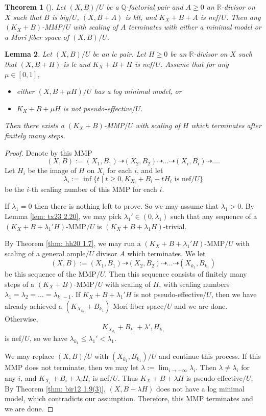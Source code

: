 \documentclass[11pt]{amsart}
\numberwithin{equation}{section}
\newcommand{\Qq}{\mathbb{Q}}
\newcommand{\Rr}{\mathbb{R}}
\newtheorem{thm}{Theorem}[section]
\newtheorem{lem}[thm]{Lemma}
\theoremstyle{definition}
\theoremstyle{definition}
\theoremstyle{definition}
\begin{document}
\begin{thm}[{\cite[Corollary 1.4.2]{BCHM10}}]\label{thm: bchm 1.4.2}
    Let $(X,B)/U$ be a $\Qq$-factorial pair and $A\geq 0$ an $\Rr$-divisor on $X$ such that $B$ is big$/U$, $(X,B+A)$ is klt, and $K_X+B+A$ is nef$/U$. Then any $(K_X+B)$-MMP$/U$ with scaling of $A$ terminates with either a minimal model or a Mori fiber space of $(X,B)/U$.
\end{thm}


\begin{lem}\label{lem: gmmp scaling numbers go to 0}
Let $(X,B)/U$ be an lc pair. Let $H\geq 0$ be an $\Rr$-divisor on $X$ such that $(X,B+H)$ is lc and $K_X+B+H$ is nef$/U$. Assume that for any $\mu\in [0,1]$,
\begin{itemize}
    \item either $(X,B+\mu H)/U$ has a log minimal model, or
    \item $K_X+B+\mu H$ is not pseudo-effective$/U$.
\end{itemize}
Then there exists a $(K_X+B)$-MMP$/U$ with scaling of $H$ which terminates after finitely many steps.
\end{lem}
\begin{proof}
Denote by this MMP
$$(X,B):=(X_1,B_1)\dashrightarrow (X_2,B_2)\dashrightarrow\dots\dashrightarrow (X_i,B_i)\dashrightarrow\dots.$$
Let $H_i$ be the image of $H$ on $X_i$ for each $i$, and let
$$\lambda_i:=\inf\{t\mid t\geq 0, K_{X_i}+B_i+tH_i\text{ is nef/}U\}$$
be the $i$-th scaling number of this MMP for each $i$.


If $\lambda_1=0$ then there is nothing left to prove. So we may assume that $\lambda_1>0$. By Lemma \ref{lem: tx23 2.20}, we may pick $\lambda_1'\in (0,\lambda_1)$ such that any sequence of a $(K_X+B+\lambda_1'H)$-MMP$/U$ is $(K_X+B+\lambda_1H)$-trivial. 

By Theorem \ref{thm: hh20 1.7}, we may run a $(K_X+B+\lambda_1'H)$-MMP$/U$ with scaling of a general ample$/U$ divisor $A$ which terminates. We let
$$(X,B):=(X_1,B_1)\dashrightarrow (X_2,B_2)\dashrightarrow\dots\dashrightarrow (X_{k_1},B_{k_1})$$
be this sequence of the MMP$/U$. Then this sequence consists of finitely many steps of a $(K_X+B)$-MMP$/U$ with scaling of $H$, with scaling numbers $\lambda_1=\lambda_2=\dots=\lambda_{k_1-1}$. If  $K_X+B+\lambda_1'H$ is not pseudo-effective$/U$, then we have already achieved a $(K_{X_{k_1}}+B_{k_1})$-Mori fiber space$/U$ and we are done. Otherwise,
$$K_{X_{k_1}}+B_{k_1}+\lambda'_1H_{k_1}$$
is nef$/U$, so we have $\lambda_{k_1}\leq\lambda_1'<\lambda_1$. 

We may replace $(X,B)/U$ with $(X_{k_1},B_{k_1})/U$ and continue this process. If this MMP does not terminate, then we may let $\lambda:=\lim_{i\rightarrow+\infty}\lambda_i$. Then $\lambda\not=\lambda_i$ for any $i$, and $K_{X_i}+B_i+\lambda_iH_i$ is nef$/U$. Thus $K_X+B+\lambda H$ is pseudo-effective$/U$. By Theorem \ref{thm: bir12 1.9(3)}, $(X,B+\lambda H)$ does not have a log minimal model, which contradicts our assumption. Therefore, this MMP terminates and we are done.
\end{proof}
\end{document}
